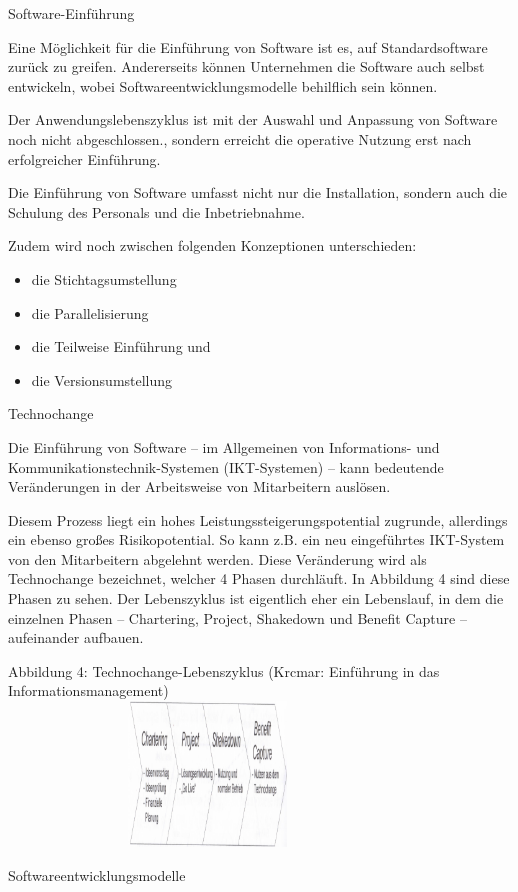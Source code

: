 \documentclass{article}
\begin{document}
\bigskip

Software-Einführung

Eine Möglichkeit für die Einführung von Software ist es, auf Standardsoftware zurück zu greifen. Andererseits können
Unternehmen die Software auch selbst entwickeln, wobei Softwareentwicklungsmodelle behilflich sein können.

Der Anwendungslebenszyklus ist mit der Auswahl und Anpassung von Software noch nicht abgeschlossen., sondern erreicht
die operative Nutzung erst nach erfolgreicher Einführung.

Die Einführung von Software umfasst nicht nur die Installation, sondern auch die Schulung des Personals und die
Inbetriebnahme.

Zudem wird noch zwischen folgenden Konzeptionen unterschieden: 

\begin{itemize}
\item die Stichtagsumstellung
\item die Parallelisierung
\item die Teilweise Einführung und
\item die Versionsumstellung
\end{itemize}

\bigskip

Technochange

Die Einführung von Software – im Allgemeinen von Informations- und Kommunikationstechnik-Systemen (IKT-Systemen) – kann
bedeutende Veränderungen in der Arbeitsweise von Mitarbeitern auslösen. 

Diesem Prozess liegt ein hohes Leistungssteigerungspotential zugrunde, allerdings ein ebenso großes Risikopotential.
\newline
So kann z.B. ein neu eingeführtes IKT-System von den Mitarbeitern abgelehnt werden. Diese Veränderung wird als
Technochange bezeichnet, welcher 4 Phasen durchläuft. In Abbildung 4 sind diese Phasen zu sehen. Der Lebenszyklus ist
eigentlich eher ein Lebenslauf, in dem die einzelnen Phasen – Chartering, Project, Shakedown und Benefit Capture –
aufeinander aufbauen.



\begin{center}
\begin{minipage}{11.056cm}
Abbildung 4: Technochange-Lebenszyklus (Krcmar: Einführung in das Informationsmanagement)
\includegraphics[width=10.573cm,height=3.874cm]{ErsterEntwurfderHausarbeitAlina-img/ErsterEntwurfderHausarbeitAlina-img004.pdf}\end{minipage}
\end{center}
\newline
\newline
Softwareentwicklungsmodelle
\end{document}
